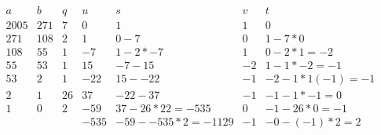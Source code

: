 \documentclass[]{article}
\title{}
\author{}
\date{}
\begin{document}
\maketitle



\section{}

$\begin{array}{ccccccc}
	a & b & q & u & s & v & t \\ 
	2005 & 271 & 7 & 0 & 1 & 1 & 0 \\ 
	271 & 108 & 2 & 1 & 0-7 & 0 & 1-7*0 \\ 
	108 & 55 & 1 & -7 & 1-2*-7 & 1 & 0-2*1=-2 \\ 
	55 & 53 & 1 & 15 & -7-15 & -2 & 1-1*-2 = -1 \\ 
	53 & 2 & 1 & -22 & 15- -22 & -1 & -2-1*1(-1)=-1 \\ 
	2 & 1 & 26 & 37 & -22-37 & -1 & -1-1*-1= 0 \\ 
	1 & 0 & 2 & -59 & 37-26*22= -535 & 0 & -1-26*0 = -1 \\ 
	&  &  & -535 & -59--535*2 =-1129 & -1 & -0-(-1)*2=2
\end{array} $
\end{document}
